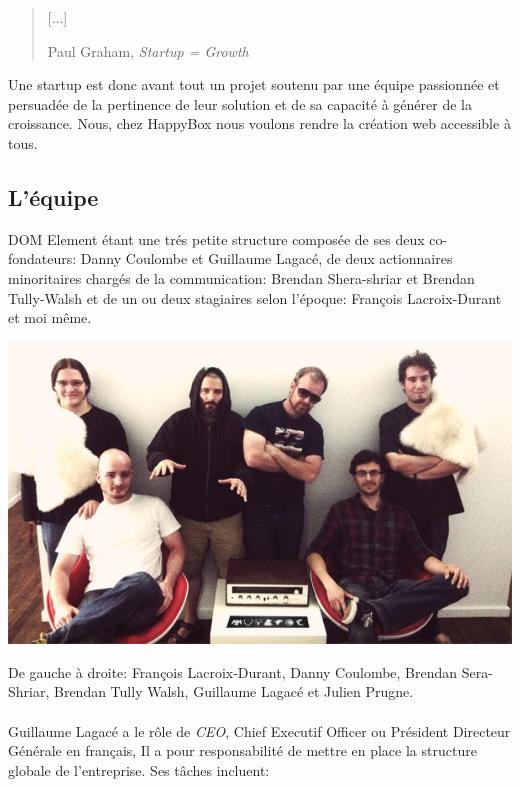 \documentclass[11pt, a4paper ]{article}
\begin{document}
\begin{spacing}{1.5}
\begin{quote}
	[...]


	\caption{Paul Graham, \emph{Startup = Growth\cite{startupGrowth}}}
\end{quote}

Une startup est donc avant tout un projet soutenu par une équipe passionnée et persuadée de la pertinence de leur solution et de sa capacité à générer de la croissance. Nous, chez HappyBox nous voulons rendre la création web accessible à tous.

		\subsection{L'équipe} %
DOM Element étant une trés petite structure composée de ses deux co-fondateurs: Danny Coulombe et Guillaume Lagacé, de deux actionnaires minoritaires chargés de la communication: Brendan Shera-shriar et Brendan Tully-Walsh et de un ou deux stagiaires selon l'époque: François Lacroix-Durant et moi même.

\begin{center}
	\includegraphics[width=\textwidth]{images/team/team.jpg}

	 De gauche à droite: François Lacroix-Durant, Danny Coulombe, Brendan Sera-Shriar, Brendan Tully Walsh, Guillaume Lagacé et Julien Prugne.
\end{center}

\paragraph{}
	Guillaume Lagacé a le rôle de \emph{CEO}, Chief Executif Officer ou Président Directeur Générale en français, Il a pour responsabilité de mettre en place la structure globale de l'entreprise.
	Ses tâches incluent:


\end{spacing}
\end{document}
